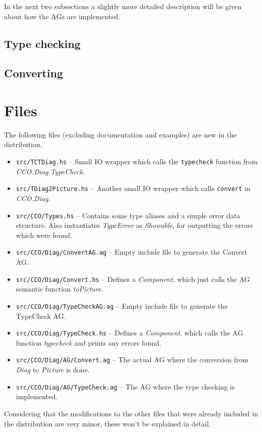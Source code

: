 \documentclass[a4paper]{article}
\begin{document}
In the next two subsections a slightly more detailed description will be given about how the AGs are implemented. 

\subsection{Type checking}

\subsection{Converting}



\section{Files}

The following files (excluding documentation and examples) are new in the distribution. 

\begin{itemize}
    \item \texttt{src/TCTDiag.hs} -- Small IO wrapper which calls the \texttt{typecheck} function from \emph{CCO.Diag.TypeCheck}. 
    \item \texttt{src/TDiag2Picture.hs} -- Another small IO wrapper which calls \texttt{convert} in \emph{CCO.Diag}.
    \item \texttt{src/CCO/Types.hs} -- Contains some type aliases and a simple error data structure. Also instantiates \emph{TypeError} as \emph{Showable}, for outputting the errors which were found. 
    \item \texttt{src/CCO/Diag/ConvertAG.ag} -- Empty include file to generate the Convert AG.
    \item \texttt{src/CCO/Diag/Convert.hs} -- Defines a \emph{Component}, which just calls the AG semantic function \emph{toPicture}. 
    \item \texttt{src/CCO/Diag/TypeCheckAG.ag} -- Empty include file to generate the TypeCheck AG.
    \item \texttt{src/CCO/Diag/TypeCheck.hs} -- Defines a \emph{Component}, which calls the AG function \emph{typecheck} and prints any errors found.
    \item \texttt{src/CCO/Diag/AG/Convert.ag} -- The actual AG where the conversion from \emph{Diag} to \emph{Picture} is done. 
    \item \texttt{src/CCO/Diag/AG/TypeCheck.ag} -- The AG where the type checking is implemented.
\end{itemize}

Considering that the modifications to the other files that were already included in the distribution are very minor, these won't be explained in detail. 
\end{document}
